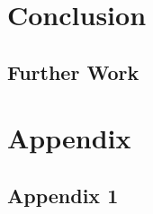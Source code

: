 \documentclass{article}
\begin{document}
\section{Conclusion}
\subsection{Further Work}

 
\section{Appendix}

\subsection{Appendix 1} %
%











     
\end{document}
